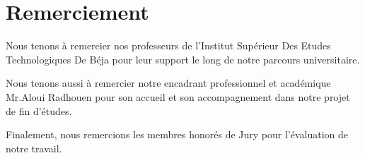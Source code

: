 
\chapter*{Remerciement}
Nous tenons à remercier nos professeurs de l'Institut Supérieur Des Etudes Technologiques De Béja pour leur support le long de notre parcours universitaire.

Nous tenons aussi à remercier notre encadrant professionnel et académique Mr.Aloui Radhouen pour son accueil et son accompagnement dans notre projet de fin d'études.

Finalement, nous remercions les membres honorés de Jury pour l'évaluation de notre travail.
